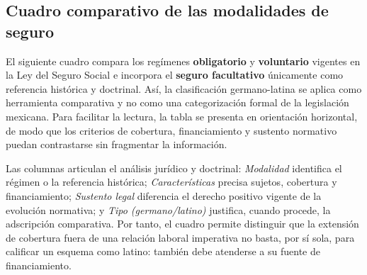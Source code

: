 \documentclass[12pt,letterpaper,oneside]{article}
\begin{document}
\subsection{Cuadro comparativo de las modalidades de seguro}

El siguiente cuadro compara los regímenes \textbf{obligatorio} y \textbf{voluntario} vigentes en la Ley del Seguro Social e incorpora el \textbf{seguro facultativo} únicamente como referencia histórica y doctrinal. Así, la clasificación germano-latina se aplica como herramienta comparativa y no como una categorización formal de la legislación mexicana. Para facilitar la lectura, la tabla se presenta en orientación horizontal, de modo que los criterios de cobertura, financiamiento y sustento normativo puedan contrastarse sin fragmentar la información.

Las columnas articulan el análisis jurídico y doctrinal: \emph{Modalidad} identifica el régimen o la referencia histórica; \emph{Características} precisa sujetos, cobertura y financiamiento; \emph{Sustento legal} diferencia el derecho positivo vigente de la evolución normativa; y \emph{Tipo (germano/latino)} justifica, cuando procede, la adscripción comparativa. Por tanto, el cuadro permite distinguir que la extensión de cobertura fuera de una relación laboral imperativa no basta, por sí sola, para calificar un esquema como latino: también debe atenderse a su fuente de financiamiento.
\end{document}
